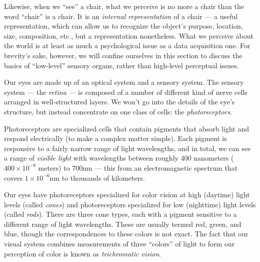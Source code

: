 Likewise, when we ``see'' a chair, what we perceive is no more a chair
than the word ``chair'' is a chair. It is an \emph{internal
representation} of a chair --- a useful representation, which can
allow us to recognize the object's purpose, location, size,
composition, etc., but a representation nonetheless. What we perceive
about the world is at least as much a psychological issue as a data
acquisition one. For brevity's sake, however, we will confine ourselves in
this section to discuss the basics of ``low-level'' sensory organs,
rather than high-level perceptual issues.

Our eyes are made up of an optical system and a sensory system.  The
sensory system --- the \emph{retina} --- is composed of a number of
different kind of nerve cells arranged in well-structured layers. We
won't go into the details of the eye's structure, but instead
concentrate on one class of cells: the \emph{photoreceptors}.

Photoreceptors are specialized cells that contain pigments that absorb
light and respond electrically (to make a complex matter simple).
Each pigment is responsive to a fairly narrow range of light
wavelengths, and in total, we can see a range of \emph{visible light}
with wavelengths between roughly 400 nanometers ($400 \times 10^{-9}$
meters) to 700nm --- this from an electromagnetic spectrum that covers
$1 \times 10^{-6}$nm to thousands of kilometers.

Our eyes have photoreceptors specialized for color vision at high
(daytime) light levels (called \emph{cones}) and photoreceptors
specialized for low (nighttime) light levels (called \emph{rods}).
There are three cone types, each with a pigment sensitive to a
different range of light wavelengths.  These are usually termed red,
green, and blue, though the correspondences to these colors is not
exact. The fact that our visual system combines measurements of three
``colors'' of light to form our perception of color is known as
\emph{trichromatic vision}.

